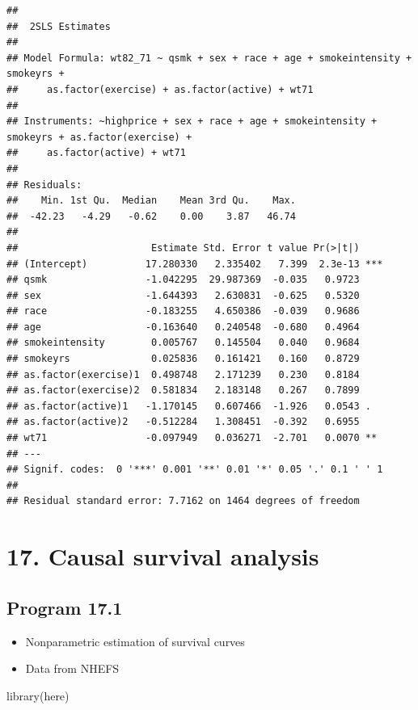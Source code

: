 \documentclass[
  10pt,
]{book}
\newenvironment{Shaded}{\begin{snugshade}}{\end{snugshade}}
\newcommand{\FunctionTok}[1]{\textcolor[rgb]{0.00,0.00,0.00}{#1}}
\newcommand{\NormalTok}[1]{#1}
\providecommand{\tightlist}{%
  \setlength{\itemsep}{0pt}\setlength{\parskip}{0pt}}
\begin{document}
\begin{verbatim}
## 
##  2SLS Estimates
## 
## Model Formula: wt82_71 ~ qsmk + sex + race + age + smokeintensity + smokeyrs + 
##     as.factor(exercise) + as.factor(active) + wt71
## 
## Instruments: ~highprice + sex + race + age + smokeintensity + smokeyrs + as.factor(exercise) + 
##     as.factor(active) + wt71
## 
## Residuals:
##    Min. 1st Qu.  Median    Mean 3rd Qu.    Max. 
##  -42.23   -4.29   -0.62    0.00    3.87   46.74 
## 
##                       Estimate Std. Error t value Pr(>|t|)    
## (Intercept)          17.280330   2.335402   7.399  2.3e-13 ***
## qsmk                 -1.042295  29.987369  -0.035   0.9723    
## sex                  -1.644393   2.630831  -0.625   0.5320    
## race                 -0.183255   4.650386  -0.039   0.9686    
## age                  -0.163640   0.240548  -0.680   0.4964    
## smokeintensity        0.005767   0.145504   0.040   0.9684    
## smokeyrs              0.025836   0.161421   0.160   0.8729    
## as.factor(exercise)1  0.498748   2.171239   0.230   0.8184    
## as.factor(exercise)2  0.581834   2.183148   0.267   0.7899    
## as.factor(active)1   -1.170145   0.607466  -1.926   0.0543 .  
## as.factor(active)2   -0.512284   1.308451  -0.392   0.6955    
## wt71                 -0.097949   0.036271  -2.701   0.0070 ** 
## ---
## Signif. codes:  0 '***' 0.001 '**' 0.01 '*' 0.05 '.' 0.1 ' ' 1
## 
## Residual standard error: 7.7162 on 1464 degrees of freedom
\end{verbatim}

\hypertarget{causal-survival-analysis}{%
\chapter*{17. Causal survival analysis}\label{causal-survival-analysis}}

\hypertarget{program-17.1}{%
\section{Program 17.1}\label{program-17.1}}

\begin{itemize}
\tightlist
\item
  Nonparametric estimation of survival curves
\item
  Data from NHEFS
\end{itemize}

\begin{Shaded}
\begin{Highlighting}[]
\FunctionTok{library}\NormalTok{(here)}
\end{Highlighting}
\end{Shaded}
\end{document}
